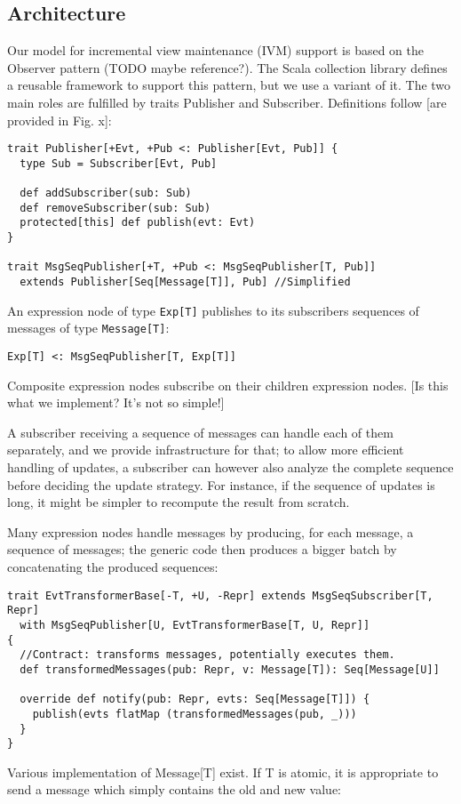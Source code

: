 \documentclass[preprint,authoryear,10pt]{sigplanconf}
\begin{document}
\subsection{Architecture}

Our model for incremental view maintenance (IVM) support is based on the
Observer pattern (TODO maybe reference?). The Scala collection library
defines a reusable framework to support this pattern, but we use a
variant of it. The two main roles are fulfilled by traits Publisher and
Subscriber. Definitions follow {[}are provided in Fig. x{]}:

\begin{verbatim}
trait Publisher[+Evt, +Pub <: Publisher[Evt, Pub]] {
  type Sub = Subscriber[Evt, Pub]

  def addSubscriber(sub: Sub)
  def removeSubscriber(sub: Sub)
  protected[this] def publish(evt: Evt)
}

trait MsgSeqPublisher[+T, +Pub <: MsgSeqPublisher[T, Pub]]
  extends Publisher[Seq[Message[T]], Pub] //Simplified
\end{verbatim}
An expression node of type \texttt{Exp{[}T{]}} publishes to its
subscribers sequences of messages of type \texttt{Message{[}T{]}}:

\texttt{Exp{[}T{]} \textless{}: MsgSeqPublisher{[}T, Exp{[}T{]}{]}}

Composite expression nodes subscribe on their children expression nodes.
{[}Is this what we implement? It's not so simple!{]}

A subscriber receiving a sequence of messages can handle each of them
separately, and we provide infrastructure for that; to allow more
efficient handling of updates, a subscriber can however also analyze the
complete sequence before deciding the update strategy. For instance, if
the sequence of updates is long, it might be simpler to recompute the
result from scratch.

Many expression nodes handle messages by producing, for each message, a
sequence of messages; the generic code then produces a bigger batch by
concatenating the produced sequences:

\begin{verbatim}
trait EvtTransformerBase[-T, +U, -Repr] extends MsgSeqSubscriber[T, Repr]
  with MsgSeqPublisher[U, EvtTransformerBase[T, U, Repr]]
{
  //Contract: transforms messages, potentially executes them.
  def transformedMessages(pub: Repr, v: Message[T]): Seq[Message[U]]

  override def notify(pub: Repr, evts: Seq[Message[T]]) {
    publish(evts flatMap (transformedMessages(pub, _)))
  }
}
\end{verbatim}
Various implementation of Message{[}T{]} exist. If T is atomic, it is
appropriate to send a message which simply contains the old and new
value:
\end{document}
